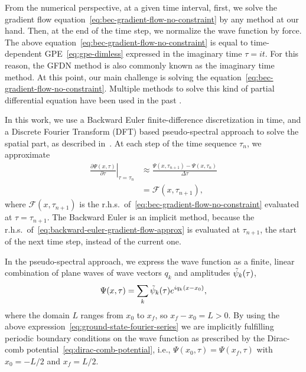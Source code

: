 \documentclass[twocolumn,showpacs,showkeys,preprintnumbers,superscriptaddress, pra, 10pt, aps]{revtex4-2}
\begin{document}
From the numerical perspective, at a given time interval, first, we solve the gradient flow
equation~\eqref{eq:bec-gradient-flow-no-constraint} by any method at our hand. Then, at the end of
the time step, we normalize the wave function by force. The above
equation~\eqref{eq:bec-gradient-flow-no-constraint} is equal to time-dependent
GPE~\eqref{eq:gpe-dimless} expressed in the imaginary time $\tau = i t$. For this reason, the GFDN
method is also commonly known as the imaginary time method. At this point, our main challenge is
solving the equation~\eqref{eq:bec-gradient-flow-no-constraint}. Multiple methods to solve this kind
of partial differential equation have been used in the past \cite{Adhikari}.

In this work, we use a Backward Euler finite-difference discretization in time, and a Discrete
Fourier Transform (DFT) based pseudo-spectral approach to solve the spatial part, as described
in~\cite[]{Bao}. At each step of the time sequence $\tau_n$, we approximate
%
\begin{align}
  \nonumber
  \left. \frac{\partial \Psi(x, \tau)}{\partial \tau} \right|_{\tau = \tau_n} & \approx \frac{\Psi(x, \tau_{n+1}) - \Psi(x, \tau_n)}{\Delta \tau} \\
  \label{eq:backward-euler-gradient-flow-approx}
                                                                              & = \mathcal{F}(x, \tau_{n+1}),
\end{align}
%
where $\mathcal{F}(x, \tau_{n+1})$ is the r.h.s.\ of~\eqref{eq:bec-gradient-flow-no-constraint}
evaluated at $\tau = \tau_{n+1}$. The Backward Euler is an implicit method, because the r.h.s.\
of~\eqref{eq:backward-euler-gradient-flow-approx} is evaluated at $\tau_{n+1}$, the start of the
next time step, instead of the current one.



In the pseudo-spectral approach, we express the wave function as a finite, linear combination of
plane waves of wave vectors $q_k$ and amplitudes $\tilde{\psi}_k(\tau)$,
%
\begin{equation}
  \label{eq:ground-state-fourier-series}
  \Psi(x, \tau) = \sum_{k} \tilde{\psi}_k(\tau) e^{i q_k (x - x_0)},
\end{equation}
where the domain $L$ ranges from $x_0$ to $x_f$, so $x_f - x_0 = L > 0$. By using the above
expression~\eqref{eq:ground-state-fourier-series} we are implicitly fulfilling periodic boundary
conditions on the wave function as prescribed by the Dirac-comb
potential~\eqref{eq:dirac-comb-potential}, i.e., $\Psi(x_0, \tau) = \Psi(x_f, \tau)$ with $x_0=-L/2$ and $x_f=L/2$.
\end{document}
